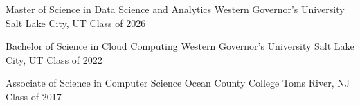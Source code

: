 

\begin{cventries}

	\cventry
	{Master of Science in Data Science and Analytics} %
	{Western Governor's University} %
	{Salt Lake City, UT} %
	{Class of 2026} %
	{
		\begin{cvitems} %
		\end{cvitems}
	}

	\cventry
	{Bachelor of Science in Cloud Computing} %
	{Western Governor's University} %
	{Salt Lake City, UT} %
	{Class of 2022} %
	{
		\begin{cvitems} %
		\end{cvitems}
	}

	\cventry
	{Associate of Science in Computer Science} %
	{Ocean County College} %
	{Toms River, NJ} %
	{Class of 2017} %
	{
		\begin{cvitems} %
		\end{cvitems}
	}


\end{cventries}
